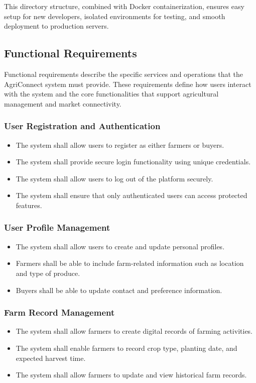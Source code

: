 \documentclass[12pt,a4paper]{article}
\begin{document}
This directory structure, combined with Docker containerization, ensures easy setup for new developers, isolated environments for testing, and smooth deployment to production servers.

\subsection{Functional Requirements}

Functional requirements describe the specific services and operations that the AgriConnect system must provide. These requirements define how users interact with the system and the core functionalities that support agricultural management and market connectivity.

\subsubsection{User Registration and Authentication}
\begin{itemize}
    \item The system shall allow users to register as either farmers or buyers.
    \item The system shall provide secure login functionality using unique credentials.
    \item The system shall allow users to log out of the platform securely.
    \item The system shall ensure that only authenticated users can access protected features.
\end{itemize}

\subsubsection{User Profile Management}
\begin{itemize}
    \item The system shall allow users to create and update personal profiles.
    \item Farmers shall be able to include farm-related information such as location and type of produce.
    \item Buyers shall be able to update contact and preference information.
\end{itemize}

\subsubsection{Farm Record Management}
\begin{itemize}
    \item The system shall allow farmers to create digital records of farming activities.
    \item The system shall enable farmers to record crop type, planting date, and expected harvest time.
    \item The system shall allow farmers to update and view historical farm records.
\end{itemize}
\end{document}
